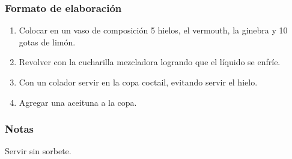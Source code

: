 \subsubsection{Formato de elaboraci\'on} 
\label{sec:title}
\bigskip 
\begin{center}
\begin{enumerate}
\item Colocar en un vaso de composición 5 hielos, el vermouth, la ginebra y 10 gotas de lim\'on.
\item Revolver con la cucharilla mezcladora logrando que el l\'iquido se enfr\'ie.
\item Con un colador servir en la copa coctail, evitando servir el hielo.
\item Agregar una aceituna a la copa.

\end{enumerate}
\end{center}
\bigskip 
\bigskip 

\subsubsection{Notas}
\bigskip 
\begin{center}
\raggedright{}Servir sin sorbete.
\end{center} 

\bigskip
\medskip 
\medskip


